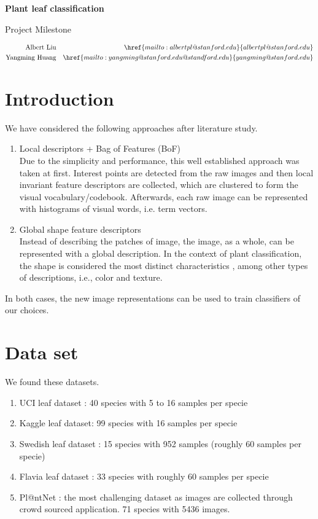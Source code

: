 \documentclass{article}
\begin{document}
\hrulefill \par
{\Large \textbf{Plant leaf classification}\par}
{\Large Project Milestone\par}
\hrulefill \par
\begin{align*}
\mathrm{Albert\ Liu}
  &&\href{mailto:albertpl@stanford.edu}{albertpl@stanford.edu}\\
\mathrm{Yangming\ Huang}
  &&\href{mailto:yangming@stanford.edu@standford.edu}{yangming@stanford.edu}\\
\end{align*}

\section{ Introduction } 
We have considered the following approaches after literature study.
\begin{enumerate}
  \item Local descriptors + Bag of Features (BoF)\\
   Due to the simplicity and performance, this well established approach was taken at first. Interest points are detected from the raw images and then local invariant feature descriptors are collected, which are clustered to form the visual vocabulary/codebook. Afterwards, each raw image can be represented with histograms of visual words, i.e. term vectors. 
 \item Global shape feature descriptors\\
   Instead of describing the patches of image, the image, as a whole, can be represented with a global description. In the context of plant classification, the shape is considered the most distinct characteristics \cite{Itheri}, among other types of descriptions, i.e., color and texture.
\end{enumerate}
In both cases, the new image representations can be used to train classifiers of our choices.


\section{Data set}
We found these datasets.
\begin{enumerate}
  \item UCI leaf dataset \cite{UCIDataSet}: 40 species with 5 to 16 samples per specie
  \item Kaggle leaf dataset\cite{KaggleDataSet}: 99 species with 16 samples per specie
  \item Swedish leaf dataset \cite{SwedishLeafDataset}: 15 species with 952 samples (roughly 60 samples per specie)
  \item Flavia leaf dataset \cite{FlaviaDataset}: 33 species with roughly 60 samples per specie
  \item Pl@ntNet \cite{PlanetNet}: the most challenging dataset as images are collected through crowd sourced application. 71 species with 5436 images.

\end{enumerate}
\end{document}
